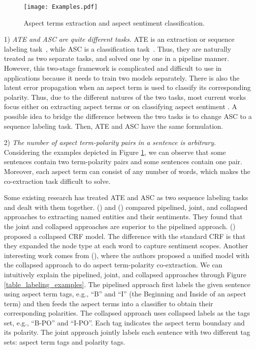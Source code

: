 \documentclass[11pt,a4paper]{article}
\begin{document}
	\begin{figure}
	\centering
		\texttt{[image: Examples.pdf]}
		\caption{Aspect terms extraction and aspect sentiment classification.}\label{fig_examples}
	\end{figure}
	
	1) \textit{ATE and ASC are quite different tasks.} ATE is an extraction or sequence labeling task~\cite{Jakob2010,Wang2016a}, while ASC is a classification task~\cite{Jiang2011target,Wagner2014,Tang2016a,Tang2016,Tay2018a}. Thus, they are naturally treated as two separate tasks, and solved one by one in a pipeline manner. However, this two-stage framework is complicated and difficult to use in applications because it needs to train two models separately. There is also the latent error propagation when an aspect term is used to classify its corresponding polarity. Thus, due to the different natures of the two tasks, most current works focus either on extracting aspect terms \cite{Yin2016,Luo2018,Xu2018} or on classifying aspect sentiment \cite{Ma2017a,Wang2018}. A possible idea to bridge the difference between the two tasks is to change ASC to a sequence labeling task. Then, ATE and ASC have the same formulation.
	
	2) \textit{The number of aspect term-polarity pairs in a sentence is arbitrary.} Considering the examples depicted in Figure \ref{fig_examples}, we can observe that some sentences contain two term-polarity pairs and some sentences contain one pair. Moreover, each aspect term can consist of any number of words, which makes the co-extraction task difficult to solve. 
	
	Some existing research has treated ATE and ASC as two sequence labeling tasks and dealt with them together.
	\citeauthor{Mitchell2013} (\citeyear{Mitchell2013}) and \citeauthor{Zhang2015} (\citeyear{Zhang2015}) compared pipelined, joint, and collapsed approaches to extracting named entities and their sentiments. They found that the joint and collapsed approaches are superior to the pipelined approach. \citeauthor{Li2017}  (\citeyear{Li2017}) proposed a collapsed CRF model. The difference with the standard CRF is that they expanded the node type at each word to capture sentiment scopes. Another interesting work comes from \citeauthor{Li2019} (\citeyear{Li2019}), where the authors proposed a unified model with the collapsed approach to do aspect term-polarity co-extraction. We can intuitively explain the pipelined, joint, and collapsed approaches through Figure \ref{table_labeling_examples}. The pipelined approach first labels the given sentence using aspect term tags, e.g., ``B'' and ``I'' (the Beginning and Inside of an aspect term) and then feeds the aspect terms into a classifier to obtain their corresponding polarities. The collapsed approach uses collapsed labels as the tags set, e.g., ``B-PO'' and ``I-PO''. Each tag indicates the aspect term boundary and its polarity. The joint approach jointly labels each sentence with two different tag sets: aspect term tags and polarity tags.
	
\end{document}
